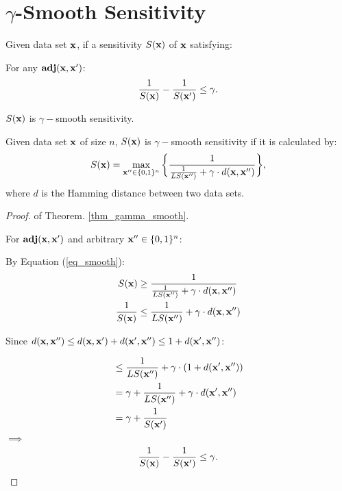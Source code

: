 \documentclass{article}
\begin{document}
\section{$\gamma$-Smooth Sensitivity}
\label{sec_mechs}

\begin{definition}
Given data set $\textbf{x}$, if a sensitivity $S(\textbf{x})$ of $\textbf{x}$ satisfying:

For any $\textbf{adj}(\textbf{x},\textbf{x}')$:
\begin{equation}
\label{eq_gamma_smooth}
\frac{1}{S(\textbf{x})} - \frac{1}{S(\textbf{x}')} \leq \gamma.
\end{equation}

$S(\textbf{x})$ is $\gamma -$smooth sensitivity.

\end{definition}


\begin{thm}
\label{thm_gamma_smooth}
Given data set $\textbf{x}$ of size $n$, $S(\textbf{x})$ is $\gamma -$smooth sensitivity if it is calculated by:
\begin{equation}
  \label{eq_smooth}
   S(\textbf{x})=\max_{\textbf{x}'' \in \{0,1\}^{n}}\bigg \{ \frac{1}{\frac{1}{LS(\textbf{x}'')} +\gamma \cdot d(\textbf{x},\textbf{x}'')} \bigg \},
\end{equation}
where $d$ is the Hamming distance between two data sets.
\end{thm}

\begin{proof}
of Theorem. \ref{thm_gamma_smooth}.

For $\textbf{adj}(\textbf{x},\textbf{x}')$ and arbitrary $\textbf{x}'' \in \{0,1\}^{n}$:

By Equation (\ref{eq_smooth}):
\begin{equation*}
\begin{split}
S(\textbf{x}) 
& \geq \frac{1}{\frac{1}{LS(\textbf{x}'')} +\gamma \cdot d(\textbf{x},\textbf{x}'')}\\
\frac{1}{S(\textbf{x})} 
& \leq \frac{1}{LS(\textbf{x}'')} +\gamma \cdot d(\textbf{x},\textbf{x}'')\\
\end{split}
\end{equation*}

Since $d(\textbf{x},\textbf{x}'') \leq d(\textbf{x},\textbf{x}') + d(\textbf{x}',\textbf{x}'') \leq 1 + d(\textbf{x}',\textbf{x}'')$:

\begin{equation*}
\begin{split}
& \leq \frac{1}{LS(\textbf{x}'')} +\gamma \cdot (1 + d(\textbf{x}',\textbf{x}''))\\
& = \gamma + \frac{1}{LS(\textbf{x}'')} +\gamma \cdot d(\textbf{x}',\textbf{x}'')\\
& = \gamma + \frac{1}{S(\textbf{x}')}
\end{split}
\end{equation*}
$\implies$
\begin{equation*}
\frac{1}{S(\textbf{x})} - \frac{1}{S(\textbf{x}')} \leq \gamma.
\end{equation*}

\end{proof}
\end{document}
